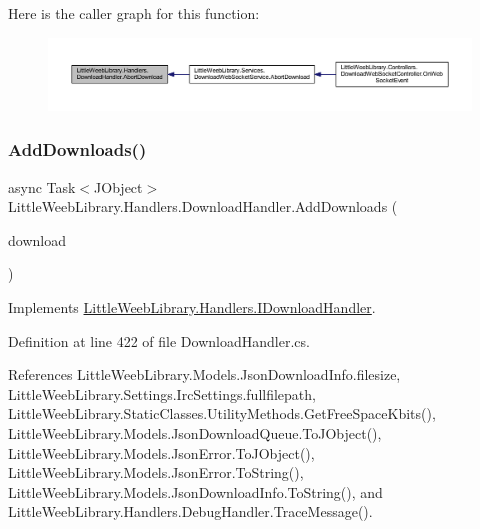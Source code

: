 Here is the caller graph for this function\+:\nopagebreak
\begin{figure}[H]
\begin{center}
\leavevmode
\includegraphics[width=350pt]{class_little_weeb_library_1_1_handlers_1_1_download_handler_a5a28664c89bf43b921fc9d3f1845b5a1_icgraph}
\end{center}
\end{figure}
\mbox{\label{class_little_weeb_library_1_1_handlers_1_1_download_handler_ac03f2dc024c0884bb7bd1c68ee03142e}} 
\subsubsection{\texorpdfstring{Add\+Downloads()}{AddDownloads()}}
{\footnotesize\ttfamily async Task$<$J\+Object$>$ Little\+Weeb\+Library.\+Handlers.\+Download\+Handler.\+Add\+Downloads (\begin{DoxyParamCaption}\item[{List$<$ \mbox{\hyperlink{class_little_weeb_library_1_1_models_1_1_json_download_info}{Json\+Download\+Info}} $>$}]{download }\end{DoxyParamCaption})}



Implements \mbox{\hyperlink{interface_little_weeb_library_1_1_handlers_1_1_i_download_handler_a615c539f5946719ae2ef4f856db91430}{Little\+Weeb\+Library.\+Handlers.\+I\+Download\+Handler}}.



Definition at line 422 of file Download\+Handler.\+cs.



References Little\+Weeb\+Library.\+Models.\+Json\+Download\+Info.\+filesize, Little\+Weeb\+Library.\+Settings.\+Irc\+Settings.\+fullfilepath, Little\+Weeb\+Library.\+Static\+Classes.\+Utility\+Methods.\+Get\+Free\+Space\+Kbits(), Little\+Weeb\+Library.\+Models.\+Json\+Download\+Queue.\+To\+J\+Object(), Little\+Weeb\+Library.\+Models.\+Json\+Error.\+To\+J\+Object(), Little\+Weeb\+Library.\+Models.\+Json\+Error.\+To\+String(), Little\+Weeb\+Library.\+Models.\+Json\+Download\+Info.\+To\+String(), and Little\+Weeb\+Library.\+Handlers.\+Debug\+Handler.\+Trace\+Message().



